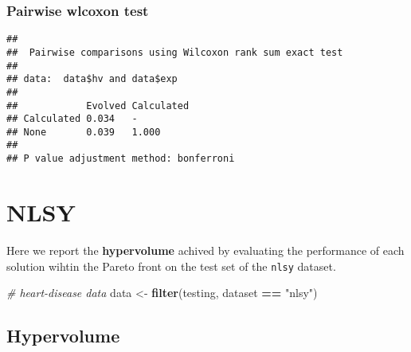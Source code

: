 \documentclass[
]{book}
\newenvironment{Shaded}{\begin{snugshade}}{\end{snugshade}}
\newcommand{\AttributeTok}[1]{\textcolor[rgb]{0.13,0.29,0.53}{#1}}
\newcommand{\CommentTok}[1]{\textcolor[rgb]{0.56,0.35,0.01}{\textit{#1}}}
\newcommand{\ConstantTok}[1]{\textcolor[rgb]{0.56,0.35,0.01}{#1}}
\newcommand{\FunctionTok}[1]{\textcolor[rgb]{0.13,0.29,0.53}{\textbf{#1}}}
\newcommand{\NormalTok}[1]{#1}
\newcommand{\OtherTok}[1]{\textcolor[rgb]{0.56,0.35,0.01}{#1}}
\newcommand{\SpecialCharTok}[1]{\textcolor[rgb]{0.81,0.36,0.00}{\textbf{#1}}}
\newcommand{\StringTok}[1]{\textcolor[rgb]{0.31,0.60,0.02}{#1}}
\begin{document}
\hypertarget{pairwise-wlcoxon-test-6}{%
\subsection{Pairwise wlcoxon test}\label{pairwise-wlcoxon-test-6}}

\begin{Shaded}
\end{Shaded}

\begin{verbatim}
## 
##  Pairwise comparisons using Wilcoxon rank sum exact test 
## 
## data:  data$hv and data$exp 
## 
##            Evolved Calculated
## Calculated 0.034   -         
## None       0.039   1.000     
## 
## P value adjustment method: bonferroni
\end{verbatim}

\hypertarget{nlsy}{%
\chapter{NLSY}\label{nlsy}}

Here we report the \textbf{hypervolume} achived by evaluating the performance of each solution wihtin the Pareto front on the test set of the \texttt{nlsy} dataset.

\begin{Shaded}
\begin{Highlighting}[]
\CommentTok{\# heart{-}disease data}
\NormalTok{data }\OtherTok{\textless{}{-}} \FunctionTok{filter}\NormalTok{(testing, dataset }\SpecialCharTok{==} \StringTok{"nlsy"}\NormalTok{)}
\end{Highlighting}
\end{Shaded}

\hypertarget{hypervolume-7}{%
\section{Hypervolume}\label{hypervolume-7}}
\end{document}

